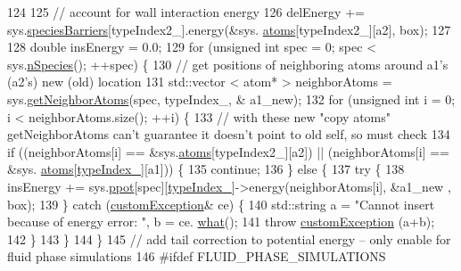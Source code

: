 \begin{DoxyCode}
124 
125         \textcolor{comment}{// account for wall interaction energy}
126         delEnergy += sys.\hyperlink{classsim_system_a5ae652ff4519f39c3862abae32a9581b}{speciesBarriers}[typeIndex2\_].energy(&sys.
      \hyperlink{classsim_system_a90421b19082f7fb8fc23b7264b1161e4}{atoms}[typeIndex2\_][a2], box);
127 
128         \textcolor{keywordtype}{double} insEnergy = 0.0;
129         \textcolor{keywordflow}{for} (\textcolor{keywordtype}{unsigned} \textcolor{keywordtype}{int} spec = 0; spec < sys.\hyperlink{classsim_system_ab5e2e9b6204de15520302fe1d51688dd}{nSpecies}(); ++spec) \{
130             \textcolor{comment}{// get positions of neighboring atoms around a1's (a2's) new (old) location}
131             std::vector < atom* > neighborAtoms = sys.\hyperlink{classsim_system_a9b3aeefa22c3b50b5913df6eea753bc6}{getNeighborAtoms}(spec, typeIndex\_, &
      a1\_new);
132             \textcolor{keywordflow}{for} (\textcolor{keywordtype}{unsigned} \textcolor{keywordtype}{int} i = 0; i < neighborAtoms.size(); ++i) \{
133                 \textcolor{comment}{// with these new "copy atoms" getNeighborAtoms can't guarantee it doesn't point to old
       self, so must check}
134                 \textcolor{keywordflow}{if} ((neighborAtoms[i] == &sys.\hyperlink{classsim_system_a90421b19082f7fb8fc23b7264b1161e4}{atoms}[typeIndex2\_][a2]) || (neighborAtoms[i] == &sys.
      \hyperlink{classsim_system_a90421b19082f7fb8fc23b7264b1161e4}{atoms}[\hyperlink{classmc_move_acb731965547b0326ef318ec96da8b46a}{typeIndex\_}][a1])) \{
135                     \textcolor{keywordflow}{continue};
136                 \} \textcolor{keywordflow}{else} \{
137                 \textcolor{keywordflow}{try} \{
138                     insEnergy += sys.\hyperlink{classsim_system_ad2e290b5963f132e6a3a56cee35c8e9f}{ppot}[spec][\hyperlink{classmc_move_acb731965547b0326ef318ec96da8b46a}{typeIndex\_}]->energy(neighborAtoms[i], &a1\_new
      , box);
139                 \} \textcolor{keywordflow}{catch} (\hyperlink{classcustom_exception}{customException}& ce) \{
140                     std::string a = \textcolor{stringliteral}{"Cannot insert because of energy error: "}, b = ce.
      \hyperlink{classcustom_exception_aeb6ab5848b038adfc68fde86a512f691}{what}();
141                     \textcolor{keywordflow}{throw} \hyperlink{classcustom_exception}{customException} (a+b);
142                 \}
143                 \}
144             \}
145             \textcolor{comment}{// add tail correction to potential energy -- only enable for fluid phase simulations}
146 \textcolor{preprocessor}{#ifdef FLUID\_PHASE\_SIMULATIONS}

\end{DoxyCode}
